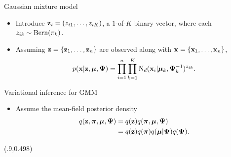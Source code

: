 \begin{frame}{Gaussian mixture model}
  \vspace{-2.5mm}
  \begin{itemize}
    \item Introduce ${\mathbf z}_i = (z_{i1},\dots,z_{iK})$, a $1$-of-$K$ binary vector, where each $z_{ik} \sim \operatorname{Bern}(\pi_k)$.
    \item Assuming ${\mathbf z} = \{{\mathbf z}_1,\dots,{\mathbf z}_n \}$ are observed along with ${\mathbf x} = \{{\mathbf x}_1,\dots,{\mathbf x}_n \}$,
    \[
      p({\mathbf x}|{\mathbf z},{\bm\mu},{\bm\Psi}) = \prod_{i=1}^n \prod_{k=1}^K \operatorname{N}_d({\mathbf x}_i|{\bm\mu}_k,{\bm\Psi}_k^{-1})^{z_{ik}}.
    \]
  \end{itemize}
\end{frame}

\begin{frame}[label=vigmm]{Variational inference for GMM}
  \begin{itemize}
    \item Assume the mean-field posterior density
    \begin{align*}
      q({\mathbf z},{\bm\pi},{\bm\mu},{\bm\Psi}) &= q({\mathbf z})q({\bm\pi},{\bm\mu},{\bm\Psi}) \\
      &= q({\mathbf z})q({\bm\pi})q({\bm\mu}|{\bm\Psi})q({\bm\Psi}).
    \end{align*}
  \end{itemize}
  
  \begin{center}
  \end{center}
  
  \begin{textblock*}{3cm}(.9\textwidth,0.498\textheight)%
    \hyperlink{vigmmsoln}{}      
  \end{textblock*}
\end{frame}

